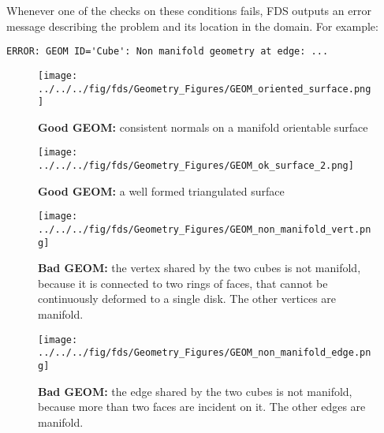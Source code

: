 \documentclass[12pt]{article}
\begin{document}
\pagebreak
Whenever one of the checks on these conditions fails, FDS outputs an error message describing the problem and its location in the domain. For example:\nopagebreak
\begin{verbatim}
ERROR: GEOM ID='Cube': Non manifold geometry at edge: ...
\end{verbatim}

\begin{figure}
	\centering
	\begin{minipage}{.45\textwidth}
		\centering
		\texttt{[image: ../../../fig/fds/Geometry\_Figures/GEOM\_oriented\_surface.png]}
		\caption{\textbf{Good {\ct GEOM}:} consistent normals on a manifold orientable surface}
		\label{figure:GEOM_oriented_surface}
	\end{minipage}%
	\hfill
	\begin{minipage}{.45\textwidth}
		\centering
		\texttt{[image: ../../../fig/fds/Geometry\_Figures/GEOM\_ok\_surface\_2.png]}
		\caption{\textbf{Good {\ct GEOM}:} a well formed triangulated surface}
		\label{figure:GEOM_ok_surface_2}
	\end{minipage}%
\end{figure}

\begin{figure}
	\centering
	\begin{minipage}{.45\textwidth}
		\centering
		\texttt{[image: ../../../fig/fds/Geometry\_Figures/GEOM\_non\_manifold\_vert.png]}
		\caption{\textbf{Bad {\ct GEOM}:} the vertex shared by the two cubes is not manifold, because it is connected to two rings of faces, that cannot be continuously deformed to a single disk. The other vertices are manifold.}
		\label{figure:GEOM_non_manifold_vert}
	\end{minipage}%
	\hfill
	\begin{minipage}{.45\textwidth}
		\centering
		\texttt{[image: ../../../fig/fds/Geometry\_Figures/GEOM\_non\_manifold\_edge.png]}
		\caption{\textbf{Bad {\ct GEOM}:} the edge shared by the two cubes is not manifold, because more than two faces are incident on it. The other edges are manifold.\newline}
		\label{figure:GEOM_non_manifold_edge}
	\end{minipage}%
\end{figure}
\end{document}
